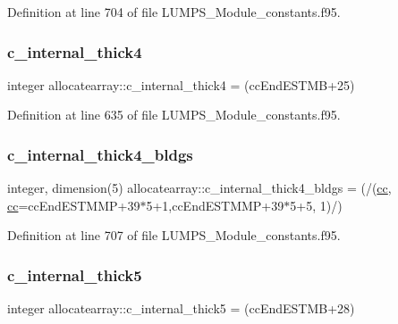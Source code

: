 Definition at line 704 of file L\+U\+M\+P\+S\+\_\+\+Module\+\_\+constants.\+f95.

\mbox{\label{namespaceallocatearray_a9f1c0ff39a8c3c66f6c9faeb7bb341d1}} 
\subsubsection{\texorpdfstring{c\+\_\+internal\+\_\+thick4}{c\_internal\_thick4}}
{\footnotesize\ttfamily integer allocatearray\+::c\+\_\+internal\+\_\+thick4 = (cc\+End\+E\+S\+T\+MB+25)}



Definition at line 635 of file L\+U\+M\+P\+S\+\_\+\+Module\+\_\+constants.\+f95.

\mbox{\label{namespaceallocatearray_a896a292ac04d4a5d5bf5622279d45b16}} 
\subsubsection{\texorpdfstring{c\+\_\+internal\+\_\+thick4\+\_\+bldgs}{c\_internal\_thick4\_bldgs}}
{\footnotesize\ttfamily integer, dimension(5) allocatearray\+::c\+\_\+internal\+\_\+thick4\+\_\+bldgs = (/(\hyperlink{namespaceallocatearray_ac863c81704eb507dee10f5e10741e10c}{cc}, \hyperlink{namespaceallocatearray_ac863c81704eb507dee10f5e10741e10c}{cc}=cc\+End\+E\+S\+T\+M\+MP+39$\ast$5+1,cc\+End\+E\+S\+T\+M\+MP+39$\ast$5+5, 1)/)}



Definition at line 707 of file L\+U\+M\+P\+S\+\_\+\+Module\+\_\+constants.\+f95.

\mbox{\label{namespaceallocatearray_a6b14bf47c27bd742277d65f2f6623ae4}} 
\subsubsection{\texorpdfstring{c\+\_\+internal\+\_\+thick5}{c\_internal\_thick5}}
{\footnotesize\ttfamily integer allocatearray\+::c\+\_\+internal\+\_\+thick5 = (cc\+End\+E\+S\+T\+MB+28)}



